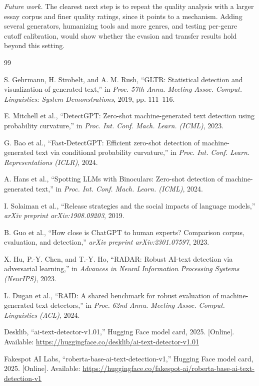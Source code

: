 \documentclass[conference]{IEEEtran}
\begin{document}
\textit{Future work.} The clearest next step is to repeat the quality analysis with a larger essay corpus and finer quality ratings, since it points to a mechanism. Adding several generators, humanizing tools and more genres, and testing per-genre cutoff calibration, would show whether the evasion and transfer results hold beyond this setting.

\balance
\begin{thebibliography}{99}

 S. Gehrmann, H. Strobelt, and A. M. Rush, ``GLTR: Statistical detection and visualization of generated text,'' in \emph{Proc. 57th Annu. Meeting Assoc. Comput. Linguistics: System Demonstrations}, 2019, pp. 111--116.

 E. Mitchell et al., ``DetectGPT: Zero-shot machine-generated text detection using probability curvature,'' in \emph{Proc. Int. Conf. Mach. Learn. (ICML)}, 2023.

 G. Bao et al., ``Fast-DetectGPT: Efficient zero-shot detection of machine-generated text via conditional probability curvature,'' in \emph{Proc. Int. Conf. Learn. Representations (ICLR)}, 2024.

 A. Hans et al., ``Spotting LLMs with Binoculars: Zero-shot detection of machine-generated text,'' in \emph{Proc. Int. Conf. Mach. Learn. (ICML)}, 2024.

 I. Solaiman et al., ``Release strategies and the social impacts of language models,'' \emph{arXiv preprint arXiv:1908.09203}, 2019.

 B. Guo et al., ``How close is ChatGPT to human experts? Comparison corpus, evaluation, and detection,'' \emph{arXiv preprint arXiv:2301.07597}, 2023.

 X. Hu, P.-Y. Chen, and T.-Y. Ho, ``RADAR: Robust AI-text detection via adversarial learning,'' in \emph{Advances in Neural Information Processing Systems (NeurIPS)}, 2023.

 L. Dugan et al., ``RAID: A shared benchmark for robust evaluation of machine-generated text detectors,'' in \emph{Proc. 62nd Annu. Meeting Assoc. Comput. Linguistics (ACL)}, 2024.

 Desklib, ``ai-text-detector-v1.01,'' Hugging Face model card, 2025. [Online]. Available: \url{https://huggingface.co/desklib/ai-text-detector-v1.01}

 Fakespot AI Labs, ``roberta-base-ai-text-detection-v1,'' Hugging Face model card, 2025. [Online]. Available: \url{https://huggingface.co/fakespot-ai/roberta-base-ai-text-detection-v1}


\end{thebibliography}
\end{document}
